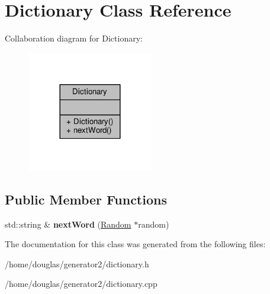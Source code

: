 \hypertarget{classDictionary}{}\section{Dictionary Class Reference}
\label{classDictionary}


Collaboration diagram for Dictionary\+:
\nopagebreak
\begin{figure}[H]
\begin{center}
\leavevmode
\includegraphics[width=156pt]{classDictionary__coll__graph}
\end{center}
\end{figure}
\subsection*{Public Member Functions}
\begin{DoxyCompactItemize}
\item 
std\+::string \& {\bfseries next\+Word} (\hyperlink{classRandom}{Random} $\ast$random)\hypertarget{classDictionary_aa8accefaff6f64e221ead60982f6dd07}{}\label{classDictionary_aa8accefaff6f64e221ead60982f6dd07}

\end{DoxyCompactItemize}


The documentation for this class was generated from the following files\+:\begin{DoxyCompactItemize}
\item 
/home/douglas/generator2/dictionary.\+h\item 
/home/douglas/generator2/dictionary.\+cpp\end{DoxyCompactItemize}
